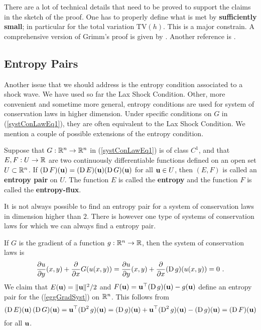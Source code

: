There are a lot of technical details that need to be proved to support
the claims in the sketch of the proof.  One has to properly define what 
is met by {\bfseries sufficiently small}; in particular for the total
variation $\text{TV}(h)$.  This is a major constrain.
A comprehensive version of Grimm's proof is given by \cite{Smo}.
Another reference is \cite{LeF}.

\subsection{Entropy Pairs}

Another issue that we should address is the entropy condition
associated to a shock wave.  We have used so far the Lax Shock
Condition.  Other, more convenient and sometime more general, entropy
conditions are used for system of conservation laws in higher
dimension.  Under specific conditions on $G$ in (\ref{systConLawEq1}),
they are often equivalent to the Lax Shock Condition.  We mention a
couple of possible extensions of the entropy condition.

\begin{defn}
Suppose that $G:\RR^n \to \RR^n$ in (\ref{systConLawEq1}) is of class
$C^1$, and that $E,F:U\to \RR$ are two continuously differentiable
functions defined on an open set $U \subset \RR^n$.  If
$(\diff F)(\VEC{u}) = (\diff E)(\VEC{u}) (\diff G)(\VEC{u})$ for all
$\VEC{u} \in U$,
then $(E,F)$ is called an {\bfseries entropy pair} on $U$.  The function $E$ is called the
{\bfseries entropy} and the function
$F$ is called the {\bfseries entropy-flux}.
\end{defn}

\begin{egg}
It is not always possible to find an entropy pair for a system of
conservation laws in dimension higher than $2$.  There is however one
type of systems of conservation laws for which we can always find a
entropy pair.

If $G$ is the gradient of a function $g:\RR^n \to \RR$,
then the system of conservation laws is
\begin{equation} \label{eggGradSyst}
\pdydx{u}{y}(x,y) + \pdfdx{G(u(x,y))}{x}
= \pdydx{u}{y}(x,y) + \pdfdx{(\diff g)(u(x,y))}{x} = 0 \ .
\end{equation}
We claim that $E(\VEC{u}) = \|\VEC{u}\|^2/2$ and
$F(\VEC{u}) = \VEC{u}^\top (\diff g)(\VEC{u}) - g(\VEC{u})$ define
an entropy pair for the (\ref{eggGradSyst}) on $\RR^n$.  This follows
from
\[
(\diff E)(\VEC{u})\, (\diff G)(\VEC{u})
= \VEC{u}^\top (\diff^2 g)(\VEC{u})
= (\diff g)(\VEC{u}) + \VEC{u}^\top (\diff^2 g)(\VEC{u}) - (\diff g)(\VEC{u})
= (\diff F)(\VEC{u})
\]
for all $\VEC{u}$.
\end{egg}

